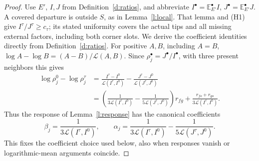 \begin{proof}
Use \(E'\), \(I,J\) from Definition~\ref{d:ratios}, and abbreviate
\(I^\bullet=\mathbb E_{E'}^\bullet I\),
\(J^\bullet=\mathbb E_{E'}^\bullet J\).  A covered departure is
outside \(S\), as in Lemma~\ref{l:local}.  That lemma and (H1)
give \(I^\tau/J^\tau\ge c_\tau\); its stated uniformity covers
the actual tips and all missing external factors, including both
corner slots.  We derive the coefficient identities directly from
Definition~\ref{d:ratios}.  For positive \(A,B\), including
\(A=B\),
\(\log A-\log B=(A-B)/\mathcal L(A,B)\).  Since
\(\rho_j^\bullet=J^\bullet/I^\bullet\), with three present
neighbors this gives
\[
 \begin{split}
 \log\rho_j^0-\log\rho_j^\tau
 &=\frac{I^\tau-I^0}{\mathcal L(I^\tau,I^0)}
       -\frac{J^\tau-J^0}{\mathcal L(J^\tau,J^0)}\\
 &=\left(\frac1{3\mathcal L(I^\tau,I^0)}
            -\frac1{5\mathcal L(J^\tau,J^0)}\right)r_{fg}
       +\frac{r_{fo}+r_{go}}{3\mathcal L(I^\tau,I^0)}.
 \end{split}
\]
Thus the response of Lemma~\ref{l:response} has the canonical
coefficients
\begin{equation}\label{e:rec-typed-coefficients}
 \beta_j=\frac1{3\mathcal L(I^\tau,I^0)},\qquad
 \alpha_j=\frac1{3\mathcal L(I^\tau,I^0)}
                     -\frac1{5\mathcal L(J^\tau,J^0)}.
\end{equation}
This fixes the coefficient choice used below, also when responses
vanish or logarithmic-mean arguments coincide.


\end{proof}
